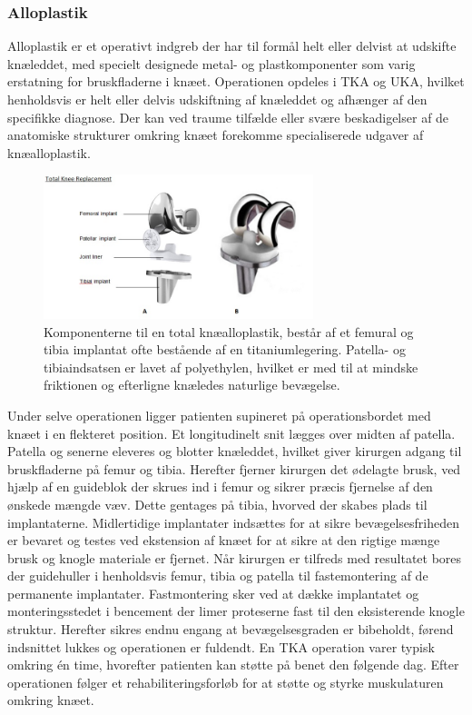 \subsubsection{Alloplastik}
Alloplastik er et operativt indgreb der har til formål helt eller delvist at udskifte knæleddet, med specielt designede metal- og plastkomponenter som varig erstatning for bruskfladerne i knæet. Operationen opdeles i TKA og UKA, hvilket henholdsvis er helt eller delvis udskiftning af knæleddet og afhænger af den specifikke diagnose. Der kan ved traume tilfælde eller svære beskadigelser af de anatomiske strukturer omkring knæet forekomme specialiserede udgaver af knæalloplastik.

\begin{figure}[H] 
\begin{center}
\includegraphics[width=0.7\textwidth]{figures/tka_implant}
\end{center}
\caption{Komponenterne til en total knæalloplastik, består af et femural og tibia implantat ofte bestående af en titaniumlegering. Patella- og tibiaindsatsen er lavet af polyethylen, hvilket er med til at mindske friktionen og efterligne knæledes naturlige bevægelse.\cite{1}} 
\label{fig:tka_implant} 
\end{figure}

Under selve operationen ligger patienten supineret på operationsbordet med knæet i en flekteret position. Et longitudinelt snit lægges over midten af patella. Patella og senerne eleveres og blotter knæleddet, hvilket giver kirurgen adgang til bruskfladerne på femur og tibia. Herefter fjerner kirurgen det ødelagte brusk, ved hjælp af en guideblok der skrues ind i femur og sikrer præcis fjernelse af den ønskede mængde væv. Dette gentages på tibia, hvorved der skabes plads til implantaterne. Midlertidige implantater indsættes for at sikre bevægelsesfriheden er bevaret og testes ved ekstension af knæet for at sikre at den rigtige mænge brusk og knogle materiale er fjernet. Når kirurgen er tilfreds med resultatet bores der guidehuller i henholdsvis femur, tibia og patella til fastemontering af de permanente implantater. Fastmontering sker ved at dække implantatet og monteringsstedet i bencement der limer proteserne fast til den eksisterende knogle struktur. Herefter sikres endnu engang at bevægelsesgraden er bibeholdt, førend indsnittet lukkes og operationen er fuldendt. En TKA operation varer typisk omkring én time, hvorefter patienten kan støtte på benet den følgende dag. Efter operationen følger et rehabiliteringsforløb for at støtte og styrke muskulaturen omkring knæet.\citep{Sanna2013} \citep{tka-technique}

